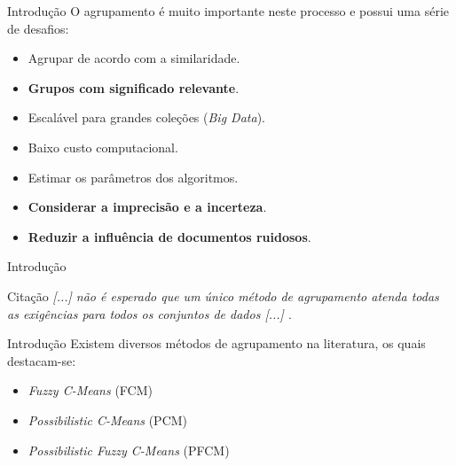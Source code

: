 \documentclass[brazil]{beamer}
\begin{document}


\begin{frame}{Introdução}
  O agrupamento é muito importante neste processo e possui uma série de desafios:
  \begin{itemize}
    \item<1 -> Agrupar de acordo com a similaridade. 
    \item<2 -> \textbf{Grupos com significado relevante}.
    \item<3 -> Escalável para grandes coleções ({\it Big Data\/}).
    \item<4 -> Baixo custo computacional.
    \item<5 -> Estimar os parâmetros dos algoritmos.
    \item<6 -> \textbf{Considerar a imprecisão e a incerteza}.
    \item<7 -> \textbf{Reduzir a influência de \alert{documentos ruidosos}}. 
  \end{itemize} 
\end{frame}

\begin{frame}{Introdução}
  \begin{block}{Citação}
    {\it [...] não é esperado que um único método de agrupamento atenda
    todas as exigências para todos os conjuntos de dados [...] \cite{Steinbach2004}\/}.
  \end{block}
\end{frame}

\begin{frame}{Introdução}
  Existem diversos métodos de agrupamento na literatura, os quais destacam-se:
  \begin{itemize}
    \item {\it Fuzzy C-Means\/} (FCM) 
    \item {\it Possibilistic C-Means\/} (PCM) 
    \item {\it Possibilistic Fuzzy C-Means\/} (PFCM) 
  \end{itemize} 

\end{frame}
\end{document}
